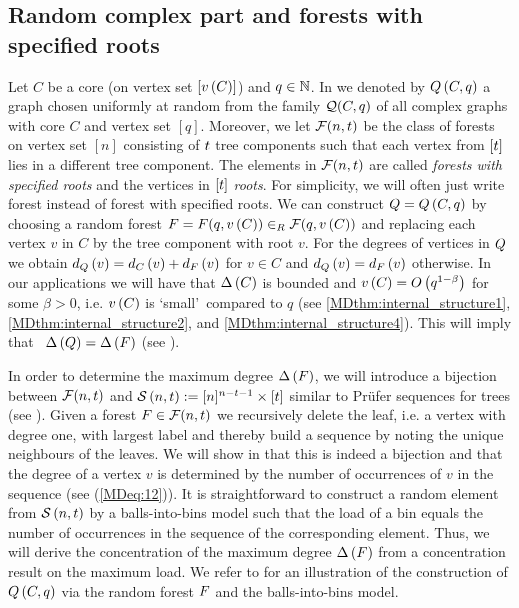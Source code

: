 \subsection{Random complex part and forests with specified roots}\label{MDsub:strategy_complex_part}
Let $C$ be a core (on vertex set $[\numberVertices{C}]$) and $q\in \N$. In  we denoted by $\complexgraph\left(C,q\right)$ a graph chosen uniformly at random from the family $\complexclass(C,q)$ of all complex graphs with core $C$ and vertex set $[q]$. Moreover, we let $\forestclass(n, \ntrees)$ be the class of forests on vertex set $[n]$ consisting of $\ntrees$ tree components such that each vertex from $[\ntrees]$ lies in a different tree component. The elements in $\forestclass(n, \ntrees)$ are called {\em forests with specified roots} and the vertices in $[\ntrees]$ {\em roots}. For simplicity, we will often just write forest instead of forest with specified roots. We can construct $\complexgraph=\complexgraph\left(C,q\right)$ by choosing a random forest $\forest=\forest(q, \numberVertices{C})\ur\forestclass(q, \numberVertices{C})$ and replacing each vertex $v$ in $C$ by the tree component with root $v$. For the degrees of vertices in $\complexgraph$ we obtain $\degree{v}{\complexgraph}=\degree{v}{C}+\degree{v}{\forest}$ for $v\in C$ and $\degree{v}{\complexgraph}=\degree{v}{\forest}$ otherwise. In our applications we will have that $\maxdegree{C}$ is bounded and $\numberVertices{C}=\bigo{q^{1-\beta}}$ for some $\beta>0$, i.e. $\numberVertices{C}$ is \lq small\rq\ compared to $q$ (see \ref{MDthm:internal_structure1}, \ref{MDthm:internal_structure2}, and \ref{MDthm:internal_structure4}). This will imply that \whp\ $\maxdegree{\complexgraph}=\maxdegree{\forest}$ (see ). 

In order to determine the maximum degree $\maxdegree{\forest}$, we will introduce a bijection between $\forestclass(n, \ntrees)$ and $\sequences{n}{\ntrees}:=[n]^{n-\ntrees-1}\times [\ntrees]$ similar to Prüfer sequences for trees (see ). Given a forest $\forest\in \forestclass(n,\ntrees)$ we recursively delete the leaf, i.e. a vertex with degree one, with largest label and thereby build a sequence by noting the unique neighbours of the leaves. We will show in  that this is indeed a bijection and that the degree of a vertex $v$ is determined by the number of occurrences of $v$ in the sequence (see (\ref{MDeq:12})). It is straightforward to construct a random element from $\sequences{n}{\ntrees}$ by a balls-into-bins model such that the load of a bin equals the number of occurrences in the sequence of the corresponding element. Thus, we will derive the concentration of the maximum degree $\maxdegree{\forest}$ from a concentration result on the maximum load. We refer to  for an illustration of the construction of $\complexgraph\left(C,q\right)$ via the random forest $\forest$ and the balls-into-bins model.

